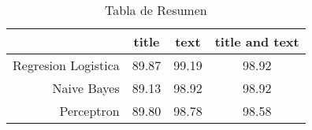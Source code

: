 \begin{table}
\centering
\caption{Tabla de Resumen}
\label{tab:resumen}
\begin{tabular}{rccc}
\toprule
{} &  title &   text &  title and text \\
\midrule
Regresion Logistica &  89.87 &  99.19 &           98.92 \\
Naive Bayes         &  89.13 &  98.92 &           98.92 \\
Perceptron          &  89.80 &  98.78 &           98.58 \\
\bottomrule
\end{tabular}
\end{table}
